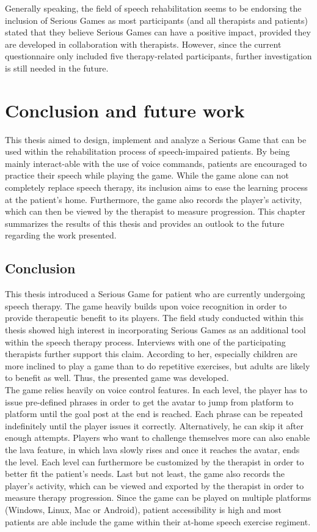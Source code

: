 \documentclass[draft,final]{vutinfth} %
\begin{document}
Generally speaking, the field of speech rehabilitation seems to be endorsing the inclusion of Serious Games as most participants (and all therapists and patients) stated that they believe Serious Games can have a positive impact, provided they are developed in collaboration with therapists. However, since the current questionnaire only included five therapy-related participants, further investigation is still needed in the future.
\chapter{Conclusion and future work}
\label{chap:conclusion}
This thesis aimed to design, implement and analyze a Serious Game that can be used within the rehabilitation process of speech-impaired patients. By being mainly interact-able with the use of voice commands, patients are encouraged to practice their speech while playing the game. While the game alone can not completely replace speech therapy, its inclusion aims to ease the learning process at the patient's home. Furthermore, the game also records the player's activity, which can then be viewed by the therapist to measure progression. This chapter summarizes the results of this thesis and provides an outlook to the future regarding the work presented.

\section{Conclusion}
This thesis introduced a Serious Game for patient who are currently undergoing speech therapy. The game heavily builds upon voice recognition in order to provide therapeutic benefit to its players. The field study conducted within this thesis showed high interest in incorporating Serious Games as an additional tool within the speech therapy process. Interviews with one of the participating therapists further support this claim. According to her, especially children are more inclined to play a game than to do repetitive exercises, but adults are likely to benefit as well. Thus, the presented game was developed.\\

The game relies heavily on voice control features. In each level, the player has to issue pre-defined phrases in order to get the avatar to jump from platform to platform until the goal post at the end is reached. Each phrase can be repeated indefinitely until the player issues it correctly. Alternatively, he can skip it after enough attempts. Players who want to challenge themselves more can also enable the lava feature, in which lava slowly rises and once it reaches the avatar, ends the level. Each level can furthermore be customized by the therapist in order to better fit the patient's needs. Last but not least, the game also records the player's activity, which can be viewed and exported by the therapist in order to measure therapy progression. Since the game can be played on multiple platforms (Windows, Linux, Mac or Android), patient accessibility is high and most patients are able include the game within their at-home speech exercise regiment. \\
\end{document}
